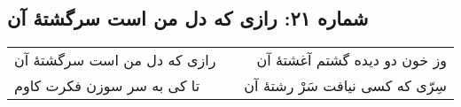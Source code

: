 \begin{center}
\section*{شماره ۲۱: رازی که دل من است سرگشتۀ آن}
\label{sec:021}
\begin{longtable}{l p{0.5cm} r}
رازی که دل من است سرگشتهٔ آن
&&
وز خون دو دیده گشتم آغشتهٔ آن
\\
تا کی به سر سوزن فکرت کاوم
&&
سِرّی که کسی نیافت سَرْ رشتهٔ آن
\\
\end{longtable}
\end{center}
